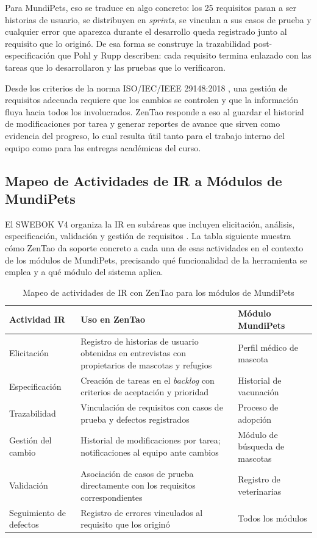 \documentclass[journal,onecolumn]{IEEEtran}
\begin{document}
Para MundiPets, eso se traduce en algo concreto: los 25 requisitos pasan a ser historias de
usuario, se distribuyen en \textit{sprints}, se vinculan a sus casos de prueba y cualquier error
que aparezca durante el desarrollo queda registrado junto al requisito que lo originó. De esa
forma se construye la trazabilidad post-especificación que Pohl y Rupp \cite{pohl2015} describen:
cada requisito termina enlazado con las tareas que lo desarrollaron y las pruebas que lo verificaron.

Desde los criterios de la norma ISO/IEC/IEEE 29148:2018 \cite{iso29148}, una gestión de requisitos
adecuada requiere que los cambios se controlen y que la información fluya hacia todos los involucrados.
ZenTao responde a eso al guardar el historial de modificaciones por tarea y generar reportes de
avance que sirven como evidencia del progreso, lo cual resulta útil tanto para el trabajo interno
del equipo como para las entregas académicas del curso.

\subsection{Mapeo de Actividades de IR a Módulos de MundiPets}

El SWEBOK V4 organiza la IR en subáreas que incluyen elicitación, análisis, especificación,
validación y gestión de requisitos \cite{swebok2024}. La tabla siguiente muestra cómo ZenTao
da soporte concreto a cada una de esas actividades en el contexto de los módulos de MundiPets,
precisando qué funcionalidad de la herramienta se emplea y a qué módulo del sistema aplica.

\begin{table}[H]
	\caption{Mapeo de actividades de IR con ZenTao para los módulos de MundiPets}
	\label{tab:mapeo-ir}
	\begin{tabularx}{\textwidth}{|l|X|l|}
		\hline
		\textbf{Actividad IR} & \textbf{Uso en ZenTao} & \textbf{Módulo MundiPets} \\
		\hline
		Elicitación & Registro de historias de usuario obtenidas en entrevistas con propietarios de mascotas y refugios & Perfil médico de mascota \\
		\hline
		Especificación & Creación de tareas en el \textit{backlog} con criterios de aceptación y prioridad & Historial de vacunación \\
		\hline
		Trazabilidad & Vinculación de requisitos con casos de prueba y defectos registrados & Proceso de adopción \\
		\hline
		Gestión del cambio & Historial de modificaciones por tarea; notificaciones al equipo ante cambios & Módulo de búsqueda de mascotas \\
		\hline
		Validación & Asociación de casos de prueba directamente con los requisitos correspondientes & Registro de veterinarias \\
		\hline
		Seguimiento de defectos & Registro de errores vinculados al requisito que los originó & Todos los módulos \\
		\hline
	\end{tabularx}
\end{table}
\end{document}
